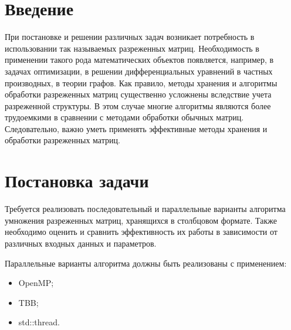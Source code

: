 \documentclass{report}
\begin{document}
\setcounter{page}{2}

\tableofcontents
\newpage

\section*{Введение}
\par При постановке и решении различных задач возникает потребность в использовании так называемых разреженных матриц. Необходимость в применении такого рода  математических объектов появляется, например, в задачах оптимизации, в решении дифференциальных уравнений в частных производных, в теории графов. Как правило, методы хранения и алгоритмы обработки разреженных матриц существенно усложнены вследствие учета разреженной структуры. В этом случае многие алгоритмы являются более трудоемкими в сравнении с методами обработки обычных матриц. Следовательно, важно уметь применять эффективные методы хранения и обработки разреженных матриц.
\newpage

\section*{Постановка задачи}
\par Требуется реализовать последовательный и параллельные варианты алгоритма умножения разреженных матриц, хранящихся в столбцовом формате. Также необходимо оценить и сравнить эффективность их работы в зависимости от различных входных данных и параметров.
\par Параллельные варианты алгоритма должны быть реализованы с применением:
\begin{itemize}
	\item OpenMP;
	\item TBB;
	\item std::thread.
\end{itemize}
\newpage
\end{document}
